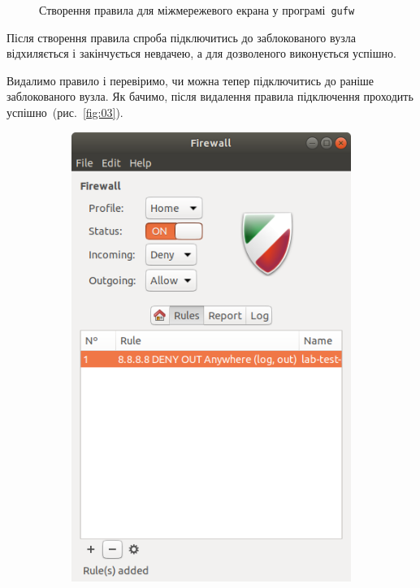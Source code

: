 \documentclass[
	a4paper,
	oneside,
	BCOR = 10mm,
	DIV = 12,
	12pt,
	headings = normal,
]{scrartcl}
\newlength{\gridunitwidth}
\newcommand{\progname}[1]{\texttt{#1}}
\begin{document}
\begin{figure}[!htbp]
\begin{subfigure}[b]{9 \gridunitwidth - 1em / 2}
				\caption{}
				\label{subfig:02-03}
			\end{subfigure}%
			\caption{Створення правила для міжмережевого екрана у програмі~\progname{\textenglish{gufw}}}
			\label{fig:02}
		\end{figure}

		Після створення правила спроба підключитись до заблокованого вузла відхиляється і закінчується невдачею, а для дозволеного виконується успішно.

		Видалимо правило і перевіримо, чи можна тепер підключитись до раніше заблокованого вузла. Як бачимо, після видалення правила підключення проходить успішно~(рис.~\ref{fig:03}).

		\begin{figure}[!htbp]
			\begin{subfigure}[b]{4 \gridunitwidth - 1em / 2}
				\includegraphics[width = \columnwidth]{./assets/10.png}

\end{subfigure}
\end{figure}
\end{document}
